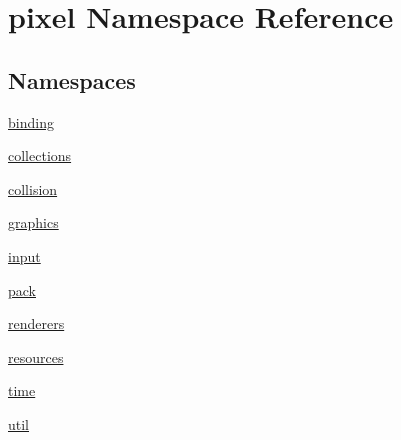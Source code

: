 \hypertarget{namespacepixel}{}\section{pixel Namespace Reference}
\label{namespacepixel}
\subsection*{Namespaces}
\begin{DoxyCompactItemize}
\item 
 \hyperlink{namespacepixel_1_1binding}{binding}
\item 
 \hyperlink{namespacepixel_1_1collections}{collections}
\item 
 \hyperlink{namespacepixel_1_1collision}{collision}
\item 
 \hyperlink{namespacepixel_1_1graphics}{graphics}
\item 
 \hyperlink{namespacepixel_1_1input}{input}
\item 
 \hyperlink{namespacepixel_1_1pack}{pack}
\item 
 \hyperlink{namespacepixel_1_1renderers}{renderers}
\item 
 \hyperlink{namespacepixel_1_1resources}{resources}
\item 
 \hyperlink{namespacepixel_1_1time}{time}
\item 
 \hyperlink{namespacepixel_1_1util}{util}
\end{DoxyCompactItemize}
